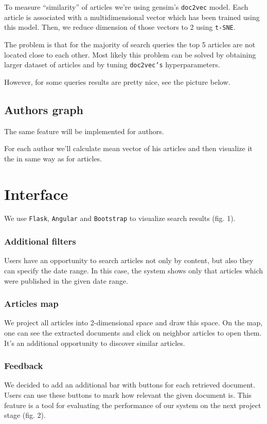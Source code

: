 To measure ``similarity'' of articles we're using gensim's \texttt{doc2vec} model. 
Each article is associated with a multidimensional vector which has been trained using this model.
Then, we reduce dimension of those vectors to 2 using \texttt{t-SNE}.

The problem is that for the majority of search queries the top 5 articles are not located close to each other.
Most likely this problem can be solved by obtaining larger dataset of articles and by tuning \texttt{doc2vec's} hyperparameters.

However, for some queries results are pretty nice, see the picture below.

\subsection{Authors graph}
The same feature will be implemented for authors. 

For each author we'll calculate mean vector of his articles and then visualize it the in same way as for articles.

\section{Interface}
We use \texttt{Flask}, \texttt{Angular} and \texttt{Bootstrap} to visualize search results (fig. 1).

\subsubsection{Additional filters}
Users have an opportunity to search articles not only by content, but also they can specify the date range. In this case, the system shows only that articles which were published in the given date range.

\subsubsection{Articles map}
We project all articles into 2-dimensional space and draw this space. On the map, one can see the extracted documents and click on neighbor articles to open them. It's an additional opportunity to discover similar articles.  

\subsubsection{Feedback}
We decided to add an additional bar with buttons for each retrieved document. Users can use these buttons to mark how relevant the given document is. This feature is a tool for evaluating the performance of our system on the next project stage (fig. 2).

